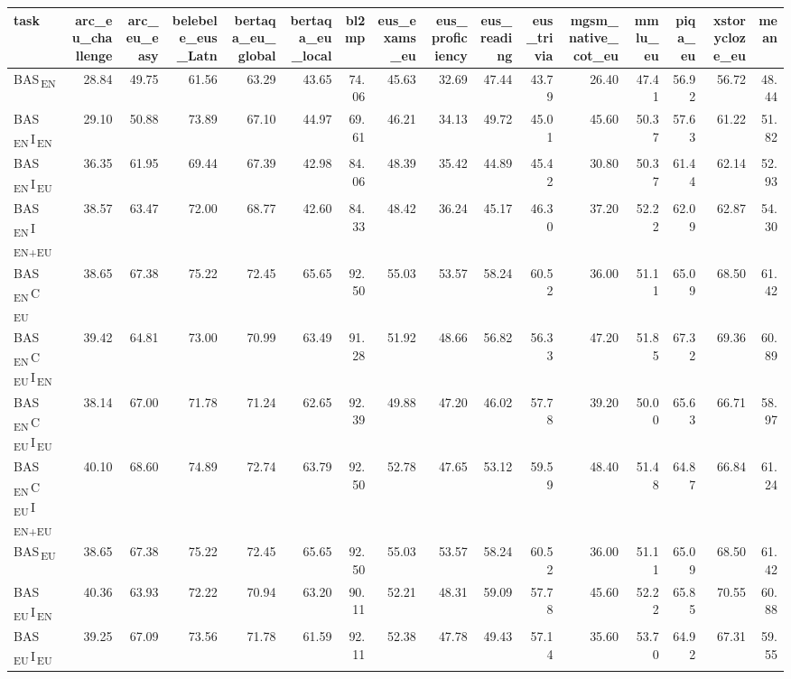 \begin{tabular}{lrrrrrrrrrrrrrrr}
\toprule
task & arc_eu_challenge & arc_eu_easy & belebele_eus_Latn & bertaqa_eu_global & bertaqa_eu_local & bl2mp & eus_exams_eu & eus_proficiency & eus_reading & eus_trivia & mgsm_native_cot_eu & mmlu_eu & piqa_eu & xstorycloze_eu & mean \\
\midrule
BAS\textsubscript{\,EN} & 28.84 & 49.75 & 61.56 & 63.29 & 43.65 & 74.06 & 45.63 & 32.69 & 47.44 & 43.79 & 26.40 & 47.41 & 56.92 & 56.72 & 48.44 \\
BAS\textsubscript{\,EN}\,I\textsubscript{\,EN} & 29.10 & 50.88 & 73.89 & 67.10 & 44.97 & 69.61 & 46.21 & 34.13 & 49.72 & 45.01 & 45.60 & 50.37 & 57.63 & 61.22 & 51.82 \\
BAS\textsubscript{\,EN}\,I\textsubscript{\,EU} & 36.35 & 61.95 & 69.44 & 67.39 & 42.98 & 84.06 & 48.39 & 35.42 & 44.89 & 45.42 & 30.80 & 50.37 & 61.44 & 62.14 & 52.93 \\
BAS\textsubscript{\,EN}\,I\textsubscript{\,EN+EU} & 38.57 & 63.47 & 72.00 & 68.77 & 42.60 & 84.33 & 48.42 & 36.24 & 45.17 & 46.30 & 37.20 & 52.22 & 62.09 & 62.87 & 54.30 \\
BAS\textsubscript{\,EN}\,C\textsubscript{\,EU} & 38.65 & 67.38 & 75.22 & 72.45 & 65.65 & 92.50 & 55.03 & 53.57 & 58.24 & 60.52 & 36.00 & 51.11 & 65.09 & 68.50 & 61.42 \\
BAS\textsubscript{\,EN}\,C\textsubscript{\,EU}\,I\textsubscript{\,EN} & 39.42 & 64.81 & 73.00 & 70.99 & 63.49 & 91.28 & 51.92 & 48.66 & 56.82 & 56.33 & 47.20 & 51.85 & 67.32 & 69.36 & 60.89 \\
BAS\textsubscript{\,EN}\,C\textsubscript{\,EU}\,I\textsubscript{\,EU} & 38.14 & 67.00 & 71.78 & 71.24 & 62.65 & 92.39 & 49.88 & 47.20 & 46.02 & 57.78 & 39.20 & 50.00 & 65.63 & 66.71 & 58.97 \\
BAS\textsubscript{\,EN}\,C\textsubscript{\,EU}\,I\textsubscript{\,EN+EU} & 40.10 & 68.60 & 74.89 & 72.74 & 63.79 & 92.50 & 52.78 & 47.65 & 53.12 & 59.59 & 48.40 & 51.48 & 64.87 & 66.84 & 61.24 \\
BAS\textsubscript{\,EU} & 38.65 & 67.38 & 75.22 & 72.45 & 65.65 & 92.50 & 55.03 & 53.57 & 58.24 & 60.52 & 36.00 & 51.11 & 65.09 & 68.50 & 61.42 \\
BAS\textsubscript{\,EU}\,I\textsubscript{\,EN} & 40.36 & 63.93 & 72.22 & 70.94 & 63.20 & 90.11 & 52.21 & 48.31 & 59.09 & 57.78 & 45.60 & 52.22 & 65.85 & 70.55 & 60.88 \\
BAS\textsubscript{\,EU}\,I\textsubscript{\,EU} & 39.25 & 67.09 & 73.56 & 71.78 & 61.59 & 92.11 & 52.38 & 47.78 & 49.43 & 57.14 & 35.60 & 53.70 & 64.92 & 67.31 & 59.55 \\

\end{tabular}
